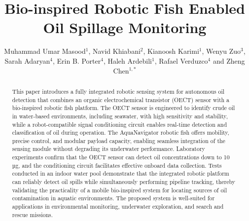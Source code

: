 \documentclass{iopjournal}
\begin{document}

\title{Bio-inspired Robotic Fish Enabled Oil Spillage Monitoring}

\author{Muhammad Umar Masood$^1$, Navid Khiabani$^2$, Kianoosh Karimi$^1$, Wenyu Zuo$^3$, Sarah Adaryan$^4$, Erin B. Porter$^4$, Haleh Ardebili$^1$, Rafael Verduzco$^4$ and Zheng Chen$^{1,*}$}







\begin{abstract}
This paper introduces a fully integrated robotic sensing system for autonomous oil detection that combines an organic electrochemical transistor (OECT) sensor with a bio-inspired robotic fish platform. The OECT sensor is engineered to identify crude oil in water-based environments, including seawater, with high sensitivity and stability, while a robot-compatible signal conditioning circuit enables real-time detection and classification of oil during operation. The AquaNavigator robotic fish offers mobility, precise control, and modular payload capacity, enabling seamless integration of the sensing module without degrading its underwater performance. Laboratory experiments confirm that the OECT sensor can detect oil concentrations down to 10 µg, and the conditioning circuit facilitates effective onboard data collection. Tests conducted in an indoor water pool demonstrate that the integrated robotic platform can reliably detect oil spills while simultaneously performing pipeline tracking, thereby validating the practicality of a mobile bio-inspired system for locating sources of oil contamination in aquatic environments. The proposed system is well-suited for applications in environmental monitoring, underwater exploration, and search and rescue missions.
\end{abstract}
\end{document}
